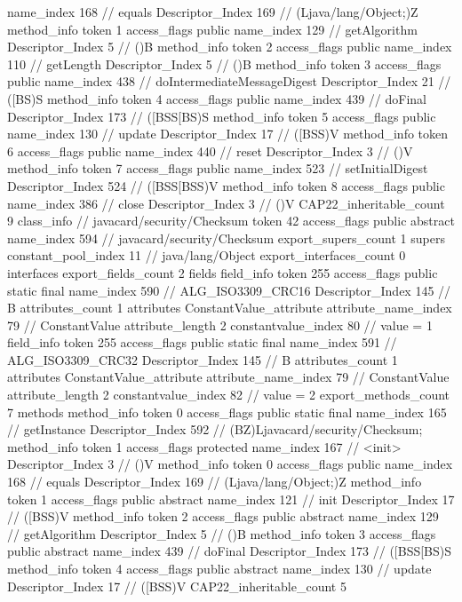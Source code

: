 {{{{{					name_index	168		// equals
					Descriptor_Index	169		// (Ljava/lang/Object;)Z
				}
				method_info {
					token	1
					access_flags	public
					name_index	129		// getAlgorithm
					Descriptor_Index	5		// ()B
				}
				method_info {
					token	2
					access_flags	public
					name_index	110		// getLength
					Descriptor_Index	5		// ()B
				}
				method_info {
					token	3
					access_flags	public
					name_index	438		// doIntermediateMessageDigest
					Descriptor_Index	21		// ([BS)S
				}
				method_info {
					token	4
					access_flags	public
					name_index	439		// doFinal
					Descriptor_Index	173		// ([BSS[BS)S
				}
				method_info {
					token	5
					access_flags	public
					name_index	130		// update
					Descriptor_Index	17		// ([BSS)V
				}
				method_info {
					token	6
					access_flags	public
					name_index	440		// reset
					Descriptor_Index	3		// ()V
				}
				method_info {
					token	7
					access_flags	public
					name_index	523		// setInitialDigest
					Descriptor_Index	524		// ([BSS[BSS)V
				}
				method_info {
					token	8
					access_flags	public
					name_index	386		// close
					Descriptor_Index	3		// ()V
				}
			}
			CAP22_inheritable_count	9
		}
		class_info {		// javacard/security/Checksum
			token	42
			access_flags	public abstract
			name_index	594		// javacard/security/Checksum
			export_supers_count	1
			supers {
				constant_pool_index	11		// java/lang/Object
			}
			export_interfaces_count	0
			interfaces {
			}
			export_fields_count	2
			fields {
			field_info {
				token	255
				access_flags	public static final
				name_index	590		// ALG_ISO3309_CRC16
				Descriptor_Index	145		// B
				attributes_count	1
				attributes {
				ConstantValue_attribute {
					attribute_name_index	79		// ConstantValue
					attribute_length	2
					constantvalue_index	80		// value = 1
				}
				}
			}
			field_info {
				token	255
				access_flags	public static final
				name_index	591		// ALG_ISO3309_CRC32
				Descriptor_Index	145		// B
				attributes_count	1
				attributes {
				ConstantValue_attribute {
					attribute_name_index	79		// ConstantValue
					attribute_length	2
					constantvalue_index	82		// value = 2
				}
				}
			}
			}
			export_methods_count	7
			methods {
				method_info {
					token	0
					access_flags	public static final
					name_index	165		// getInstance
					Descriptor_Index	592		// (BZ)Ljavacard/security/Checksum;
				}
				method_info {
					token	1
					access_flags	protected
					name_index	167		// <init>
					Descriptor_Index	3		// ()V
				}
				method_info {
					token	0
					access_flags	public
					name_index	168		// equals
					Descriptor_Index	169		// (Ljava/lang/Object;)Z
				}
				method_info {
					token	1
					access_flags	public abstract
					name_index	121		// init
					Descriptor_Index	17		// ([BSS)V
				}
				method_info {
					token	2
					access_flags	public abstract
					name_index	129		// getAlgorithm
					Descriptor_Index	5		// ()B
				}
				method_info {
					token	3
					access_flags	public abstract
					name_index	439		// doFinal
					Descriptor_Index	173		// ([BSS[BS)S
				}
				method_info {
					token	4
					access_flags	public abstract
					name_index	130		// update
					Descriptor_Index	17		// ([BSS)V
				}
			}
			CAP22_inheritable_count	5
		}
	}
}
